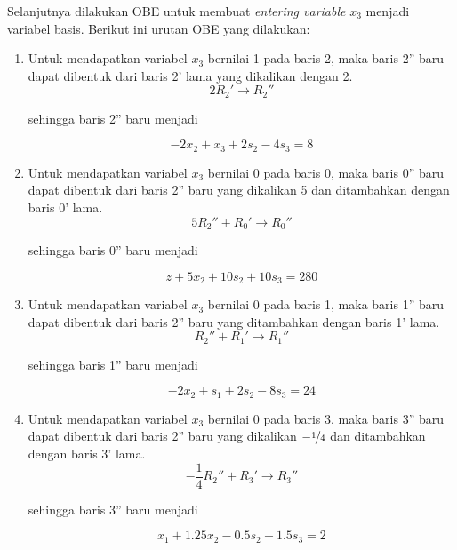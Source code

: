Selanjutnya dilakukan OBE untuk membuat \textit{entering variable} \(x_3\) menjadi variabel basis. Berikut ini urutan OBE yang dilakukan:
\begin{enumerate}
	\item Untuk mendapatkan variabel \(x_3\) bernilai 1 pada baris 2, maka baris 2'' baru dapat dibentuk dari baris 2' lama yang dikalikan dengan 2.\\

	\begin{equation*}
		2R_2' \rightarrow R_2''
	\end{equation*}

	sehingga baris 2'' baru menjadi

	\begin{equation*}
		-2x_2 + x_3 + 2s_2 - 4s_3 = 8
	\end{equation*}
	
	\item Untuk mendapatkan variabel \(x_3\) bernilai 0 pada baris 0, maka baris 0'' baru dapat dibentuk dari baris 2'' baru yang dikalikan 5 dan ditambahkan dengan baris 0' lama.\\

	\begin{equation*}
		5R_2'' + R_0' \rightarrow R_0''
	\end{equation*}

	sehingga baris 0'' baru menjadi

	\begin{equation*}
		z + 5x_2 + 10s_2 + 10s_3 = 280
	\end{equation*}
	
	\item Untuk mendapatkan variabel \(x_3\) bernilai 0 pada baris 1, maka baris 1'' baru dapat dibentuk dari baris 2'' baru yang ditambahkan dengan baris 1' lama.\\

	\begin{equation*}
		R_2'' + R_1' \rightarrow R_1''
	\end{equation*}

	sehingga baris 1'' baru menjadi

	\begin{equation*}
		-2x_2 + s_1 + 2s_2 - 8s_3 = 24
	\end{equation*}
	
	\item Untuk mendapatkan variabel \(x_3\) bernilai 0 pada baris 3, maka baris 3'' baru dapat dibentuk dari baris 2'' baru yang dikalikan \(-\nicefrac{1}{4}\) dan ditambahkan dengan baris 3' lama.\\

	\begin{equation*}
		-\frac{1}{4}R_2'' + R_3' \rightarrow R_3''
	\end{equation*}

	sehingga baris 3'' baru menjadi

	\begin{equation*}
		x_1 + 1.25x_2 - 0.5s_2 + 1.5s_3 = 2
	\end{equation*}
\end{enumerate}

